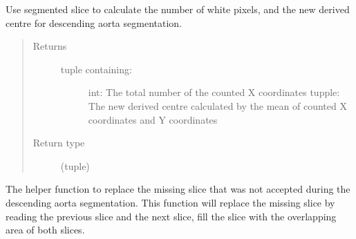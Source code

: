 \documentclass[letterpaper,10pt,english]{sphinxmanual}
\begin{document}
\begin{fulllineitems}

\begin{fulllineitems}
\label{\detokenize{AortaGeomReconDisplayModuleLib:AortaSegmenter.AortaSegmenter.__count_pixel_des}}
\sphinxAtStartPar
Use segmented slice to calculate the number of white pixels,
and the new derived centre
for descending aorta segmentation.
\begin{quote}\begin{description}
\item[{Returns}] \leavevmode
\sphinxAtStartPar
\begin{description}
\item[{tuple containing:}] \leavevmode
\sphinxAtStartPar
int: The total number of the counted X coordinates
tupple: The new derived centre calculated by the mean of counted X coordinates and Y coordinates

\end{description}


\item[{Return type}] \leavevmode
\sphinxAtStartPar
(tuple)

\end{description}\end{quote}

\end{fulllineitems}


\begin{fulllineitems}
\label{\detokenize{AortaGeomReconDisplayModuleLib:AortaSegmenter.AortaSegmenter.__filling_missing_slices}}
\sphinxAtStartPar
The helper function to replace the missing slice that was not accepted during the descending aorta segmentation.
This function will replace the missing slice by reading the previous slice and the next slice,
fill the slice with the overlapping area of both slices.

\end{fulllineitems}



\end{fulllineitems}
\end{document}

